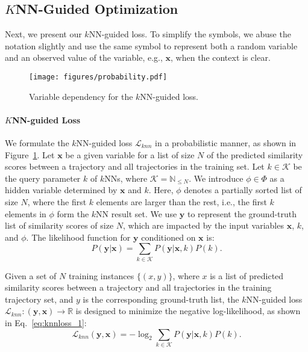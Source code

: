 \subsection{$K$NN-Guided Optimization}\label{subsec:method_loss}


Next, we present our $k$NN-guided loss. 
To simplify the symbols, we abuse the notation slightly and use the same symbol to represent both a random variable and an observed value of the variable, e.g., $\mathbf{x}$, when the context is clear.  

\begin{figure}[th]
    \centering
    \texttt{[image: figures/probability.pdf]}
    \vspace{-3mm}
    \caption{Variable dependency for the $k$NN-guided loss.}\label{fig:probability}
    \vspace{-2mm}
\end{figure}


\paragraph{$K$NN-guided Loss}
We formulate the $k$NN-guided loss $\mathcal{L}_{knn}$ in a probabilistic manner, as shown in Figure~\ref{fig:probability}. Let $\mathbf{x}$ be a given variable for a list of size $N$ of the predicted similarity scores between a trajectory and all trajectories in the training set.
Let $k \in \mathcal{K}$ be the query parameter $k$ of $k$NNs, where $\mathcal{K} = \mathbb{N}_{\leq N}$.
We introduce $\phi \in \Phi$  as a hidden variable determined by $\mathbf{x}$ and $k$. 
Here, $\phi$ denotes a partially sorted list of size $N$, where the first $k$ elements are larger than the rest, i.e., the first $k$ elements in $\phi$ form the $k$NN result set.
We use $\mathbf{y}$ to represent the ground-truth list of similarity scores of size $N$, which are impacted by the input variables $\mathbf{x}$, $k$, and $\phi$. 
The likelihood function for $\mathbf{y}$ conditioned on $\mathbf{x}$ is:
{\small
\begin{equation}\label{eq:knnloss_1}
    P(\mathbf{y} | \mathbf{x}) =  \sum_{k \in \mathcal{K}} P(\mathbf{y} | \mathbf{x}, k) P(k).
\end{equation}
}

Given a set of $N$ training instances $\{(x, y)\}$, where $x$ is a list of predicted similarity scores between a trajectory and all trajectories in the training trajectory set, and $y$ is the corresponding ground-truth list,
the $k$NN-guided loss $\mathcal{L}_{knn} :(\mathbf{y}, \mathbf{x}) \rightarrow \mathbb{R}$ is designed to minimize the negative log-likelihood, as shown in Eq.~\eqref{eq:knnloss_1}:
{\small
\begin{equation}\label{eq:knnloss_2}
    \mathcal{L}_{knn}(\mathbf{y}, \mathbf{x}) = -\log_2 \sum_{k \in \mathcal{K}} P(\mathbf{y} | \mathbf{x}, k) P(k).
\end{equation}
}

